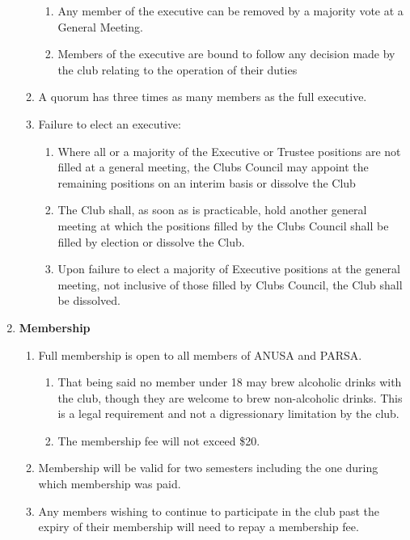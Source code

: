 \documentclass{article}
\begin{document}
\begin{enumerate}[label=\textbf{\arabic*}]
\begin{enumerate}[label=4.\arabic*]
\begin{enumerate}[label=4.8.\arabic*]
            \item Any member of the executive can be removed by a majority vote at a General Meeting.
            \item Members of the executive are bound to follow any decision made by the club relating to the operation of their duties
        \end{enumerate}
        \item A quorum has three times as many members as the full executive.
        \item Failure to elect an executive:
        \begin{enumerate}[label=4.10.\arabic*]
            \item Where all or a majority of the Executive or Trustee positions are not filled at a general meeting, the Clubs Council may appoint the remaining positions on an interim basis or dissolve the Club
            \item The Club shall, as soon as is practicable, hold another general meeting at which the positions filled by the Clubs Council shall be filled by election or dissolve the Club.
            \item Upon failure to elect a majority of Executive positions at the general meeting, not inclusive of those filled by Clubs Council, the Club shall be dissolved.
        \end{enumerate}
    \end{enumerate}

    \item \textbf{Membership}
    \begin{enumerate}[label=5.\arabic*]
        \item Full membership is open to all members of ANUSA and PARSA.
        \begin{enumerate}[label=5.1.\arabic*]
            \item That being said no member under 18 may brew alcoholic drinks with the club, though they are welcome to brew non-alcoholic drinks. This is a legal requirement and not a digressionary limitation by the club.
            \item The membership fee will not exceed \$20.
        \end{enumerate}
        \item Membership will be valid for two semesters including the one during which membership was paid.
        \item Any members wishing to continue to participate in the club past the expiry of their membership will need to repay a membership fee.
    \end{enumerate}


\end{enumerate}
\end{document}
